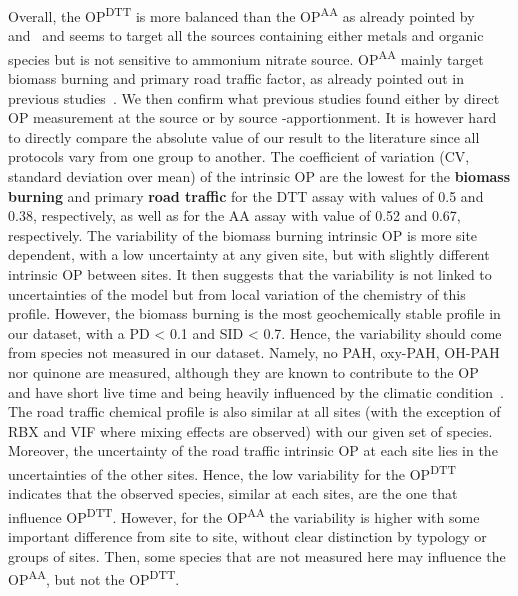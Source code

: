 \documentclass[acp]{copernicus}
\begin{document}
Overall, the OP\textsuperscript{DTT} is more balanced than the
OP\textsuperscript{AA} as already pointed by~\citet{fangOxidative2016}
and~\citet{weberApportionment2018} and seems to target all the sources containing
either metals and organic species but is not sensitive to ammonium
nitrate source. OP\textsuperscript{AA} mainly target biomass burning and
primary road traffic factor, as already pointed out in previous
studies~\citep[][and references therin]{batesReview2019}. We then confirm what
previous studies found either by direct OP measurement at the source or
by source -apportionment. It is however hard to directly compare the
absolute value of our result to the literature since all protocols vary
from one group to another. The coefficient of variation (CV, standard
deviation over mean) of the intrinsic OP are the lowest for the
\textbf{biomass burning} and primary \textbf{road traffic} for the DTT
assay with values of 0.5 and 0.38, respectively, as well as for the AA
assay with value of 0.52 and 0.67, respectively. The variability of the
biomass burning intrinsic OP is more site dependent, with a low
uncertainty at any given site, but with slightly different intrinsic OP
between sites. It then suggests that the variability is not linked to
uncertainties of the model but from local variation of the chemistry of
this profile. However, the biomass burning is the most geochemically
stable profile in our dataset, with a PD \textless{} 0.1 and SID
\textless{} 0.7. Hence, the variability should come from species not
measured in our dataset. Namely, no PAH, oxy-PAH, OH-PAH nor quinone are
measured, although they are known to contribute to the
OP~\citep{charrierDithiothreitol2012} and have short live time and being heavily influenced
by the climatic condition~\citep{mierschImpact2019}. The road traffic
chemical profile is also similar at all sites (with the exception of RBX
and VIF where mixing effects are observed) with our given set of
species. Moreover, the uncertainty of the road traffic intrinsic OP at
each site lies in the uncertainties of the other sites. Hence, the low
variability for the OP\textsuperscript{DTT} indicates that the observed
species, similar at each sites, are the one that influence
OP\textsuperscript{DTT}. However, for the OP\textsuperscript{AA} the
variability is higher with some important difference from site to site,
without clear distinction by typology or groups of sites. Then, some
species that are not measured here may influence the
OP\textsuperscript{AA}, but not the OP\textsuperscript{DTT}.
\end{document}
